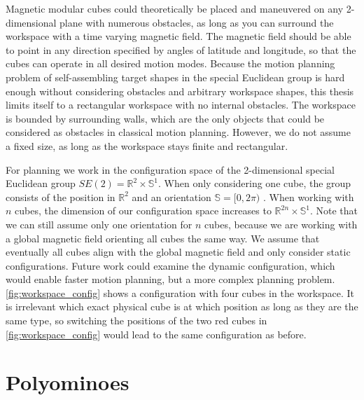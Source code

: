 Magnetic modular cubes could theoretically be placed and maneuvered on any 2-dimensional plane with numerous obstacles, as long as you can surround the workspace with a time varying magnetic field.
The magnetic field should be able to point in any direction specified by angles of latitude and longitude, so that the cubes can operate in all desired motion modes.
Because the motion planning problem of self-assembling target shapes in the special Euclidean group is hard enough without considering obstacles and arbitrary workspace shapes, this thesis limits itself to a rectangular workspace with no internal obstacles.
The workspace is bounded by surrounding walls, which are the only objects that could be considered as obstacles in classical motion planning.
However, we do not assume a fixed size, as long as the workspace stays finite and rectangular.

For planning we work in the configuration space of the 2-dimensional special Euclidean group $SE(2) = \mathbb{R}^2 \times \mathbb{S}^1$.
When only considering one cube, the group consists of the position in $\mathbb{R}^2$ and an orientation $\mathbb{S} = [0,2\pi)$ \cite{LaValle2006}.
When working with $n$ cubes, the dimension of our configuration space increases to $\mathbb{R}^{2n} \times \mathbb{S}^1$.
Note that we can still assume only one orientation for $n$ cubes, because we are working with a global magnetic field orienting all cubes the same way.
We assume that eventually all cubes align with the global magnetic field and only consider static configurations.
Future work could examine the dynamic configuration, which would enable faster motion planning, but a more complex planning problem.
\autoref{fig:workspace_config} shows a configuration with four cubes in the workspace.
It is irrelevant which exact physical cube is at which position as long as they are the same type, so switching the positions of the two red cubes in \autoref{fig:workspace_config} would lead to the same configuration as before.

\section{Polyominoes}
\label{sec:polys}

